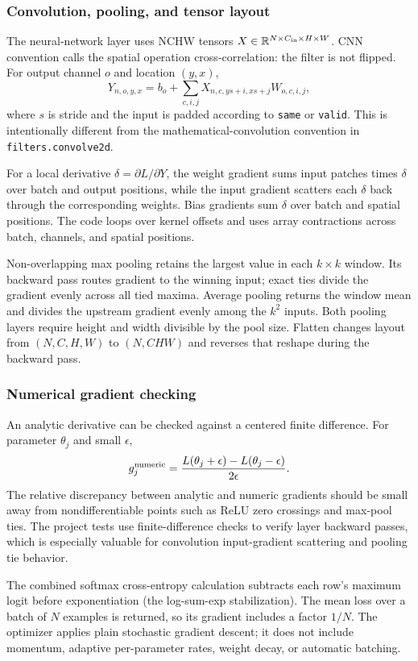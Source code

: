\documentclass[11pt,a4paper]{article}
\newcommand{\R}{\mathbb{R}}
\newcommand{\1}{\mathbf{1}}
\begin{document}
\subsubsection{Convolution, pooling, and tensor layout}

The neural-network layer uses NCHW tensors
$X\in\R^{N\times C_{\rm in}\times H\times W}$. CNN convention calls the
spatial operation cross-correlation: the filter is not flipped. For output
channel $o$ and location $(y,x)$,
\[
 Y_{n,o,y,x}=b_o+\sum_{c,i,j}
 X_{n,c,ys+i,xs+j}W_{o,c,i,j},
\]
where $s$ is stride and the input is padded according to \texttt{same} or \texttt{valid}.
This is intentionally different from the mathematical-convolution convention
in \texttt{filters.convolve2d}.

For a local derivative $\delta=\partial L/\partial Y$, the weight gradient
sums input patches times $\delta$ over batch and output positions, while the
input gradient scatters each $\delta$ back through the corresponding weights.
Bias gradients sum $\delta$ over batch and spatial positions. The code loops
over kernel offsets and uses array contractions across batch, channels, and
spatial positions.

Non-overlapping max pooling retains the largest value in each $k\times k$
window. Its backward pass routes gradient to the winning input; exact ties
divide the gradient evenly across all tied maxima. Average pooling returns the
window mean and divides the upstream gradient evenly among the $k^2$ inputs.
Both pooling layers require height and width divisible by the pool size.
Flatten changes layout from $(N,C,H,W)$ to $(N,CHW)$ and reverses that reshape
during the backward pass.

\subsubsection{Numerical gradient checking}

An analytic derivative can be checked against a centered finite difference.
For parameter $\theta_j$ and small $\epsilon$,
\[
 g_j^{\rm numeric}=\frac{L(\theta_j+\epsilon)-L(\theta_j-\epsilon)}{2\epsilon}.
\]
The relative discrepancy between analytic and numeric gradients should be
small away from nondifferentiable points such as ReLU zero crossings and
max-pool ties. The project tests use finite-difference checks to verify layer
backward passes, which is especially valuable for convolution input-gradient
scattering and pooling tie behavior.

The combined softmax cross-entropy calculation subtracts each row's maximum
logit before exponentiation (the log-sum-exp stabilization). The mean loss over
a batch of $N$ examples is returned, so its gradient includes a factor $1/N$.
The optimizer applies plain stochastic gradient descent; it does not include
momentum, adaptive per-parameter rates, weight decay, or automatic batching.
\end{document}

